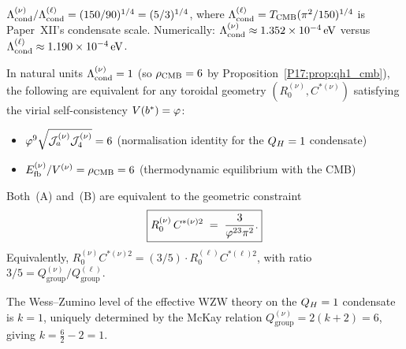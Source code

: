 \begin{remark}
\label{P17:rem:scale_ratio}
$\Lambda_{\mathrm{cond}}^{(\nu)}/\Lambda_{\mathrm{cond}}^{(\ell)}=(150/90)^{1/4}=(5/3)^{1/4}$,
where $\Lambda_{\mathrm{cond}}^{(\ell)}=T_{\mathrm{CMB}}(\pi^2/150)^{1/4}$ is Paper~XII's
condensate scale.  Numerically:
$\Lambda_{\mathrm{cond}}^{(\nu)}\approx1.352\times10^{-4}\,\mathrm{eV}$
versus $\Lambda_{\mathrm{cond}}^{(\ell)}\approx1.190\times10^{-4}\,\mathrm{eV}$.
\end{remark}

\begin{theorem}[$c=1$ two-route equivalence]
\label{P17:thm:qh1_tworoute}
In natural units $\Lambda_{\mathrm{cond}}^{(\nu)}=1$ (so $\rho_{\mathrm{CMB}}=6$ by
Proposition~\ref{P17:prop:qh1_cmb}), the following are equivalent for
any toroidal geometry $(R_0^{(\nu)},C^{*(\nu)})$ satisfying
the virial self-consistency $V(b^*)=\varphi$:
\begin{itemize}
\item[\textup{(A)}]
  $\varphi^9\sqrt{\mathcal{J}_a^{(\nu)}\mathcal{J}_4^{(\nu)}}=6$
  \quad\textup{(normalisation identity for the $\QH=1$ condensate)}
\item[\textup{(B)}]
  $E_{\mathrm{fb}}^{(\nu)}/V^{(\nu)}=\rho_{\mathrm{CMB}}=6$
  \quad\textup{(thermodynamic equilibrium with the CMB)}
\end{itemize}
Both~\textup{(A)} and~\textup{(B)} are equivalent to the geometric
constraint
\begin{equation}
  \boxed{R_0^{(\nu)}\,C^{*(\nu)2}
  \;=\; \frac{3}{\varphi^{23}\pi^2}.}
  \label{P17:eq:RC2_nu}
\end{equation}
Equivalently, $R_0^{(\nu)}C^{*(\nu)2}=(3/5)\cdot R_0^{(\ell)}C^{*(\ell)2}$,
with ratio $3/5=Q_{\mathrm{group}}^{(\nu)}/Q_{\mathrm{group}}^{(\ell)}$.
\end{theorem}

\begin{theorem}[WZ descent forces $k=1$ for the $\QH=1$ condensate]
\label{P17:thm:kone_forced}
The Wess--Zumino level of the effective WZW theory on the $\QH=1$
condensate is $k=1$, uniquely determined by the McKay relation
$Q_{\mathrm{group}}^{(\nu)}=2(k+2)=6$, giving $k=\frac{6}{2}-2=1$.
\end{theorem}

